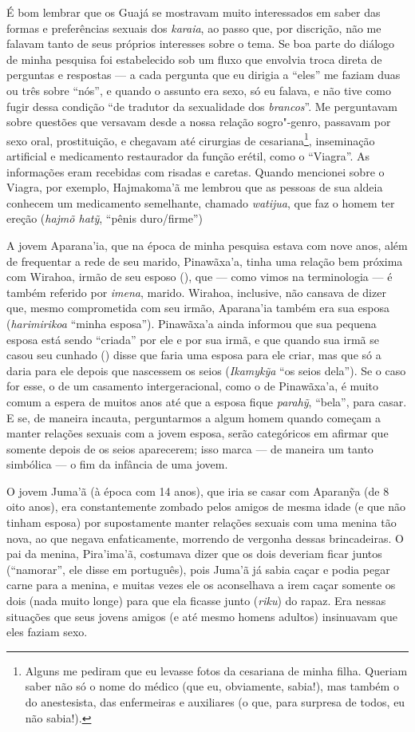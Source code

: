É bom lembrar que os Guajá se mostravam muito interessados em saber das
formas e preferências sexuais dos \emph{karaia}, ao passo que, por
discrição, não me falavam tanto de seus próprios interesses sobre o
tema. Se boa parte do diálogo de minha pesquisa foi estabelecido sob um
fluxo que envolvia troca direta de perguntas e respostas --- a cada
pergunta que eu dirigia a ``eles'' me faziam duas ou três sobre ``nós'', e
quando o assunto era sexo, só eu falava, e não tive como fugir dessa
condição ``de tradutor da sexualidade dos \emph{brancos}''. Me perguntavam
sobre questões que versavam desde a nossa relação sogro"-genro, passavam
por sexo oral, prostituição, e chegavam até cirurgias de
cesariana\footnote{Alguns me pediram que eu levasse fotos da cesariana
  de minha filha. Queriam saber não só o nome do médico (que eu,
  obviamente, sabia!), mas também o do anestesista, das enfermeiras e
  auxiliares (o que, para surpresa de todos, eu não sabia!).},
inseminação artificial e medicamento restaurador da função erétil, como
o ``Viagra''. As informações eram recebidas com risadas e caretas.
Quando mencionei sobre o Viagra, por exemplo, Hajmakoma'ã me lembrou que
as pessoas de sua aldeia conhecem um medicamento semelhante, chamado
\emph{watijua}, que faz o homem ter ereção (\emph{hajmõ hatỹ}, ``pênis
duro/firme'')

A jovem Aparana'ia, que na época de minha pesquisa estava com nove anos,
além de frequentar a rede de seu marido, Pinawãxa'a, tinha uma relação
bem próxima com Wirahoa, irmão de seu esposo (), que --- como vimos na
terminologia --- é também referido por \emph{imena}, marido. Wirahoa,
inclusive, não cansava de dizer que, mesmo comprometida com seu irmão,
Aparana'ia também era sua esposa (\emph{harimirikoa} ``minha esposa'').
Pinawãxa'a ainda informou que sua pequena esposa está sendo ``criada'' por
ele e por sua irmã, e que quando sua irmã se casou seu cunhado ()
disse que faria uma esposa para ele criar, mas que só a daria para ele
depois que nascessem os seios (\emph{Ikamykỹa} ``os seios dela''). Se o
caso for esse, o de um casamento intergeracional, como o de Pinawãxa'a,
é muito comum a espera de muitos anos até que a esposa fique
\emph{parahỹ}, ``bela'', para casar. E se, de maneira incauta,
perguntarmos a algum homem quando começam a manter relações sexuais com
a jovem esposa, serão categóricos em afirmar que somente depois de os
seios aparecerem; isso marca --- de maneira um tanto simbólica --- o fim da
infância de uma jovem.

O jovem Juma'ã (à época com 14 anos), que iria se casar com Aparanỹa (de
8 oito anos), era constantemente zombado pelos amigos de mesma idade (e
que não tinham esposa) por supostamente manter relações sexuais com uma
menina tão nova, ao que negava enfaticamente, morrendo de vergonha
dessas brincadeiras. O pai da menina, Pira'ima'ã, costumava dizer que os
dois deveriam ficar juntos (``namorar'', ele disse em português), pois
Juma'ã já sabia caçar e podia pegar carne para a menina, e muitas vezes
ele os aconselhava a irem caçar somente os dois (nada muito longe) para
que ela ficasse junto (\emph{riku}) do rapaz. Era nessas situações que
seus jovens amigos (e até mesmo homens adultos) insinuavam que eles
faziam sexo.

